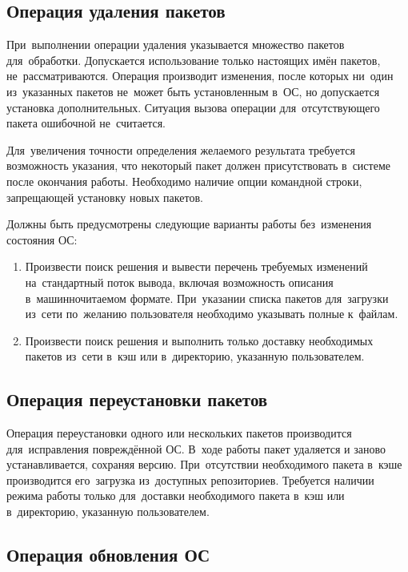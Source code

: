 \subsection{Операция удаления пакетов}

При~выполнении операции удаления указывается множество пакетов для~обработки.
Допускается использование только настоящих имён пакетов,  не~рассматриваются.
Операция производит изменения, после которых ни~один из~указанных пакетов не~может быть установленным в~ОС,
но допускается установка дополнительных.
Ситуация вызова операции для~отсутствующего пакета ошибочной не~считается.

Для~увеличения точности определения желаемого результата требуется возможность указания, 
что некоторый пакет должен присутствовать в~системе после окончания работы.
Необходимо наличие опции командной строки, запрещающей установку новых пакетов. 

Должны быть предусмотрены следующие варианты работы без~изменения состояния ОС:

\begin{enumerate}

\item {
Произвести поиск решения и вывести перечень требуемых изменений на~стандартный поток вывода,
включая возможность описания в~машинночитаемом формате.
При~указании списка пакетов для~загрузки из~сети по~желанию пользователя необходимо указывать полные  к~файлам.
}

\item {
Произвести поиск решения и выполнить только доставку необходимых пакетов из~сети в~кэш или в~директорию, указанную пользователем.
}

\end{enumerate}

\subsection{Операция переустановки пакетов}

Операция переустановки одного или нескольких пакетов производится для~исправления повреждённой ОС.
В~ходе работы пакет удаляется и заново устанавливается, сохраняя версию.
При~отсутствии необходимого пакета в~кэше производится  его~загрузка из~доступных репозиториев.
Требуется наличии режима работы только для~доставки необходимого пакета в~кэш или в~директорию, указанную пользователем.

\subsection{Операция обновления ОС}

